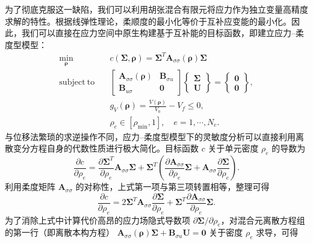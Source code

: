 为了彻底克服这一缺陷，我们可以利用胡张混合有限元将应力作为独立变量高精度求解的特性。根据线弹性理论，柔顺度的最小化等价于互补应变能的最小化。因此，我们可以直接在应力空间中原生构建基于互补能的目标函数，即建立应力--柔度型模型：
\begin{equation} \label{eq:ch5_hz_complementary_energy_model}
	\begin{aligned} 
		\min_{\boldsymbol{\rho}} \quad & c(\boldsymbol{\Sigma},\boldsymbol{\rho}) = \boldsymbol{\Sigma}^T\boldsymbol{A}_{\sigma\sigma}(\boldsymbol{\rho})\boldsymbol{\Sigma}\\ 
		\mathrm{subject~to} \quad & 
		\begin{bmatrix}
			\boldsymbol{A}_{\sigma\sigma}(\boldsymbol{\rho}) & \boldsymbol{B}_{\sigma{u}}\\
			\boldsymbol{B}_{u\sigma} & \boldsymbol{0}
		\end{bmatrix}
		\begin{Bmatrix}
			\boldsymbol\Sigma\\
			\boldsymbol{U}
		\end{Bmatrix} =  
		\begin{Bmatrix}
			\boldsymbol{0}\\
			\boldsymbol{0}
		\end{Bmatrix},\\
		& g_V(\boldsymbol{\rho}) = \frac{V(\boldsymbol{\rho})}{V_0} - V_f \leq 0,\\ 
		& \rho_e \in [\rho_{\min}, 1],\quad{e}=1,\cdots,N_c.
	\end{aligned}
\end{equation}
与位移法繁琐的求逆操作不同，应力--柔度型模型下的灵敏度分析可以直接利用离散变分方程自身的代数性质进行极大简化。目标函数 $c$ 关于单元密度 $\rho_e$ 的导数为
\[
\frac{\partial c}{\partial \rho_e} = \frac{\partial \boldsymbol{\Sigma}^T}{\partial \rho_e} \boldsymbol{A}_{\sigma\sigma} \boldsymbol{\Sigma} + \boldsymbol{\Sigma}^T \left( \frac{\partial \boldsymbol{A}_{\sigma\sigma}}{\partial \rho_e} \boldsymbol{\Sigma} + \boldsymbol{A}_{\sigma\sigma} \frac{\partial \boldsymbol{\Sigma}}{\partial \rho_e} \right).
\]
利用柔度矩阵 $\boldsymbol{A}_{\sigma\sigma}$ 的对称性，上式第一项与第三项转置相等，整理可得
\[
\frac{\partial c}{\partial \rho_e} = 2 \boldsymbol{\Sigma}^T \boldsymbol{A}_{\sigma\sigma} \frac{\partial \boldsymbol{\Sigma}}{\partial \rho_e} + \boldsymbol{\Sigma}^T \frac{\partial \boldsymbol{A}_{\sigma\sigma}}{\partial \rho_e} \boldsymbol{\Sigma}.
\]
为了消除上式中计算代价高昂的应力场隐式导数项 $\partial \boldsymbol{\Sigma} / \partial \rho_e$，对混合元离散方程组的第一行（即离散本构方程） $\boldsymbol{A}_{\sigma\sigma}(\boldsymbol{\rho})\boldsymbol{\Sigma} + \boldsymbol{B}_{\sigma u}\boldsymbol{U} = \boldsymbol{0}$ 关于密度 $\rho_e$ 求导，可得
